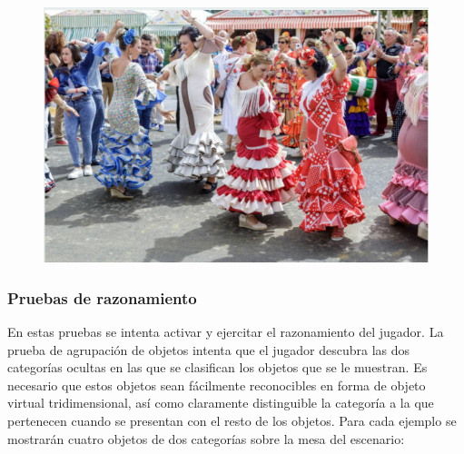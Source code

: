 \begin{figure}[H]
\begin{minipage}{.3\textwidth}
  \label{fig:E4_colegio}
\end{minipage}
\begin{minipage}{.3\textwidth}
  \centering
  \includegraphics[width=.9\linewidth]{04.Desarrollo/04.Entrega4/01.Iteracion4_1/00.Figuras/06.feria.png}
  \label{fig:E4_feria}
\end{minipage}
\end{figure}


\subsubsection{Pruebas de razonamiento}


En estas pruebas se intenta activar y ejercitar el razonamiento del jugador. La prueba de agrupación de objetos intenta que el jugador descubra las dos categorías ocultas en las que se clasifican los objetos que se le muestran. Es necesario que estos objetos sean fácilmente reconocibles en forma de objeto virtual tridimensional, así como claramente distinguible la categoría a la que pertenecen cuando se presentan con el resto de los objetos. Para cada ejemplo se mostrarán cuatro objetos de dos categorías sobre la mesa del escenario:

